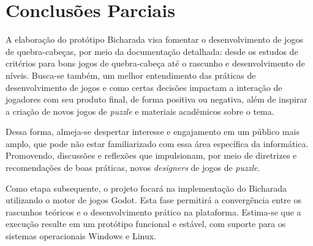 \chapter{Conclusões Parciais}
\label{cap:05}

A elaboração do protótipo Bicharada visa fomentar o desenvolvimento de jogos de quebra-cabeças, por meio da documentação detalhada: desde os estudos de critérios para bons jogos de quebra-cabeça até o rascunho e desenvolvimento de níveis. Busca-se também, um melhor entendimento das práticas de desenvolvimento de jogos e como certas decisões impactam a interação de jogadores com seu produto final, de forma positiva ou negativa, além de inspirar a criação de novos jogos de \textit{puzzle} e materiais acadêmicos sobre o tema. 

Dessa forma, almeja-se despertar interesse e engajamento em um público mais amplo, que pode não estar familiarizado com essa área específica da informática. Promovendo, discussões e reflexões que impulsionam, por meio de diretrizes e recomendações de boas práticas, novos \textit{designers} de jogos de \textit{puzzle}.

Como etapa subsequente, o projeto focará na implementação do Bicharada utilizando o motor de jogos Godot. Esta fase permitirá a convergência entre os rascunhos teóricos e o desenvolvimento prático na plataforma. Estima-se que a execução resulte em um protótipo funcional e estável, com suporte para os sistemas operacionais Windows e Linux.